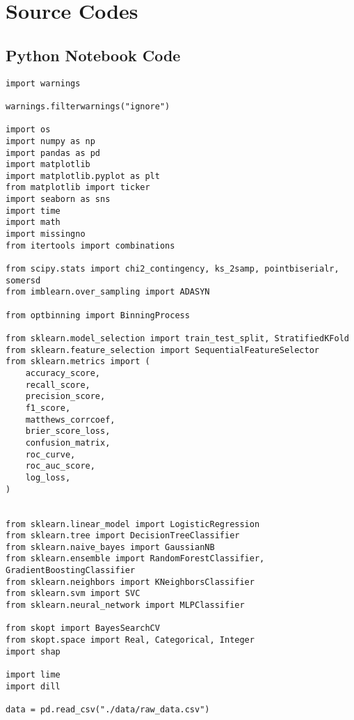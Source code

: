 \fancyheadoffset{0pt}
\chapter{Source Codes}


\section{Python Notebook Code}
\begin{lstlisting}[basicstyle=\footnotesize\ttfamily]
import warnings

warnings.filterwarnings("ignore")

import os
import numpy as np
import pandas as pd
import matplotlib
import matplotlib.pyplot as plt
from matplotlib import ticker
import seaborn as sns
import time
import math
import missingno
from itertools import combinations

from scipy.stats import chi2_contingency, ks_2samp, pointbiserialr, somersd
from imblearn.over_sampling import ADASYN

from optbinning import BinningProcess

from sklearn.model_selection import train_test_split, StratifiedKFold
from sklearn.feature_selection import SequentialFeatureSelector
from sklearn.metrics import (
	accuracy_score,
	recall_score,
	precision_score,
	f1_score,
	matthews_corrcoef,
	brier_score_loss,
	confusion_matrix,
	roc_curve,
	roc_auc_score,
	log_loss,
)


from sklearn.linear_model import LogisticRegression
from sklearn.tree import DecisionTreeClassifier
from sklearn.naive_bayes import GaussianNB
from sklearn.ensemble import RandomForestClassifier, GradientBoostingClassifier
from sklearn.neighbors import KNeighborsClassifier
from sklearn.svm import SVC
from sklearn.neural_network import MLPClassifier

from skopt import BayesSearchCV
from skopt.space import Real, Categorical, Integer
import shap

import lime
import dill

data = pd.read_csv("./data/raw_data.csv")
\end{lstlisting}
